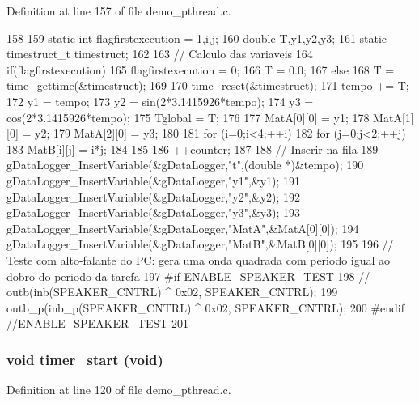 Definition at line 157 of file demo\_\-pthread.c.


\begin{DoxyCode}
158 { 
159         static int flagfirstexecution = 1,i,j;
160         double T,y1,y2,y3;
161         static timestruct_t timestruct;
162 
163         // Calculo das variaveis
164         if(flagfirstexecution){
165                 flagfirstexecution = 0;
166                 T = 0.0;
167         } else {
168                 T = time_gettime(&timestruct);
169         }
170         time_reset(&timestruct);
171         tempo += T;
172         y1 = tempo;
173         y2 = sin(2*3.1415926*tempo);
174         y3 = cos(2*3.1415926*tempo);
175         Tglobal = T;
176 
177         MatA[0][0] = y1;
178         MatA[1][0] = y2;
179         MatA[2][0] = y3;
180 
181         for (i=0;i<4;++i){
182                 for (j=0;j<2;++j){
183                         MatB[i][j] = i*j;
184                 }
185         }
186         ++counter;
187 
188         // Inserir na fila
189         gDataLogger_InsertVariable(&gDataLogger,"t",(double *)&tempo);
190         gDataLogger_InsertVariable(&gDataLogger,"y1",&y1);
191         gDataLogger_InsertVariable(&gDataLogger,"y2",&y2);
192         gDataLogger_InsertVariable(&gDataLogger,"y3",&y3);
193         gDataLogger_InsertVariable(&gDataLogger,"MatA",&MatA[0][0]);
194         gDataLogger_InsertVariable(&gDataLogger,"MatB",&MatB[0][0]);
195 
196         // Teste com alto-falante do PC: gera uma onda quadrada com periodo igual
       ao dobro do periodo da tarefa
197 #if ENABLE_SPEAKER_TEST
198 //      outb(inb(SPEAKER_CNTRL) ^ 0x02, SPEAKER_CNTRL);
199         outb_p(inb_p(SPEAKER_CNTRL) ^ 0x02, SPEAKER_CNTRL);
200 #endif //ENABLE_SPEAKER_TEST
201 }
\end{DoxyCode}
\subsubsection[{timer\_\-start}]{\setlength{\rightskip}{0pt plus 5cm}void timer\_\-start (void)}\label{demo__pthread_8c_aeb09db6f93d0e0f5aad6e9d2345793e0}


Definition at line 120 of file demo\_\-pthread.c.


